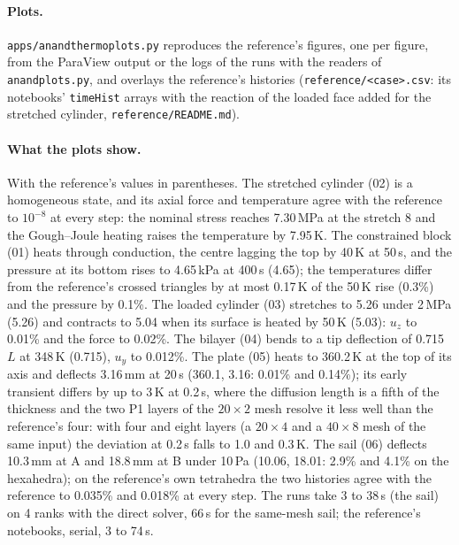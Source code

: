 \documentclass[11pt]{article}
\DeclareRobustCommand{\code}[1]{{\def\_{\textunderscore\allowbreak}\texttt{#1}}}
\DeclareRobustCommand{\file}[1]{{\def\_{\textunderscore\allowbreak}\texttt{#1}}}
\begin{document}
\paragraph{Plots.}
\file{apps/anand\_thermo\_plots.py} reproduces the reference's figures, one
per figure, from the ParaView output or the logs of the runs with the
readers of \file{anand\_plots.py}, and overlays the reference's histories
(\file{reference/<case>.csv}: its notebooks' \code{timeHist} arrays with
the reaction of the loaded face added for the stretched cylinder,
\file{reference/README.md}).

\paragraph{What the plots show.}
With the reference's values in parentheses.  The stretched cylinder (02) is
a homogeneous state, and its axial force and temperature agree with the
reference to $10^{-8}$ at every step: the nominal stress reaches
7.30\,MPa at the stretch 8 and the Gough--Joule heating raises the
temperature by 7.95\,K.  The constrained block (01) heats through
conduction, the centre lagging the top by 40\,K at 50\,s, and the pressure
at its bottom rises to 4.65\,kPa at 400\,s (4.65); the temperatures differ
from the reference's crossed triangles by at most 0.17\,K of the 50\,K rise
(0.3\%) and the pressure by 0.1\%.  The loaded cylinder (03) stretches to
5.26 under 2\,MPa (5.26) and contracts to 5.04 when its surface is heated
by 50\,K (5.03): $u_z$ to 0.01\% and the force to 0.02\%.  The bilayer (04)
bends to a tip deflection of 0.715\,$L$ at 348\,K (0.715), $u_y$ to 0.012\%.
The plate (05) heats to 360.2\,K at the top of its axis and deflects
3.16\,mm at 20\,s (360.1, 3.16: 0.01\% and 0.14\%); its early transient
differs by up to 3\,K at 0.2\,s, where the diffusion length is a fifth of
the thickness and the two P1 layers of the $20\times2$ mesh resolve it less
well than the reference's four: with four and eight layers (a
$20\times4$ and a $40\times8$ mesh of the same input) the deviation at
0.2\,s falls to 1.0 and 0.3\,K.  The sail (06) deflects 10.3\,mm at A and
18.8\,mm at B under 10\,Pa (10.06, 18.01: 2.9\% and 4.1\% on the hexahedra);
on the reference's own tetrahedra the two histories agree with the
reference to 0.035\% and 0.018\% at every step.  The runs take 3 to 38\,s
(the sail) on 4 ranks with the direct solver, 66\,s for the same-mesh sail;
the reference's notebooks, serial, 3 to 74\,s.

\end{document}
